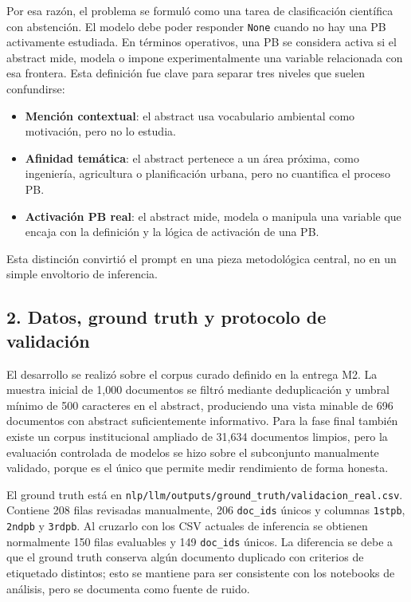 Por esa razón, el problema se formuló como una tarea de clasificación científica con abstención. El modelo debe poder responder \texttt{None} cuando no hay una PB activamente estudiada. En términos operativos, una PB se considera activa si el abstract mide, modela o impone experimentalmente una variable relacionada con esa frontera. Esta definición fue clave para separar tres niveles que suelen confundirse:

\begin{itemize}
\item \textbf{Mención contextual}: el abstract usa vocabulario ambiental como motivación, pero no lo estudia.
\item \textbf{Afinidad temática}: el abstract pertenece a un área próxima, como ingeniería, agricultura o planificación urbana, pero no cuantifica el proceso PB.
\item \textbf{Activación PB real}: el abstract mide, modela o manipula una variable que encaja con la definición y la lógica de activación de una PB.
\end{itemize}

Esta distinción convirtió el prompt en una pieza metodológica central, no en un simple envoltorio de inferencia.

\subsection{2. Datos, ground truth y protocolo de validación}

El desarrollo se realizó sobre el corpus curado definido en la entrega M2. La muestra inicial de 1,000 documentos se filtró mediante deduplicación y umbral mínimo de 500 caracteres en el abstract, produciendo una vista minable de 696 documentos con abstract suficientemente informativo. Para la fase final también existe un corpus institucional ampliado de 31,634 documentos limpios, pero la evaluación controlada de modelos se hizo sobre el subconjunto manualmente validado, porque es el único que permite medir rendimiento de forma honesta.

El ground truth está en \texttt{nlp/llm/outputs/ground\_truth/validacion\_real.csv}. Contiene 208 filas revisadas manualmente, 206 \texttt{doc\_ids} únicos y columnas \texttt{1stpb}, \texttt{2ndpb} y \texttt{3rdpb}. Al cruzarlo con los CSV actuales de inferencia se obtienen normalmente 150 filas evaluables y 149 \texttt{doc\_ids} únicos. La diferencia se debe a que el ground truth conserva algún documento duplicado con criterios de etiquetado distintos; esto se mantiene para ser consistente con los notebooks de análisis, pero se documenta como fuente de ruido.

